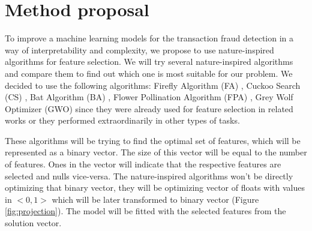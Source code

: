 \documentclass[runningheads]{llncs}
\begin{document}
\section{Method proposal}





To improve a machine learning models for the transaction fraud detection in a way of interpretability and complexity, we propose to use nature-inspired algorithms for feature selection. We will try several nature-inspired algorithms and compare them to find out which one is most suitable for our problem. We decided to use the following algorithms: Firefly Algorithm (FA) \cite{fister2013comprehensive}, Cuckoo Search (CS) \cite{yang2009cuckoo}, Bat Algorithm (BA) \cite{yang2010new}, Flower Pollination Algorithm (FPA) \cite{yang2012flower}, Grey Wolf Optimizer (GWO) \cite{Mirjalili_Mirjalili_Lewis_2014} since they were already used for feature selection in related works or they performed extraordinarily in other types of tasks.

These algorithms will be trying to find the optimal set of features, which will be represented as a binary vector. The size of this vector will be equal to the number of features. Ones in the vector will indicate that the respective features are selected and nulls vice-versa. The nature-inspired algorithms won't be directly optimizing that binary vector, they will be optimizing vector of floats with values in $<0, 1>$ which will be later transformed to binary vector (Figure \ref{fig:projection}). The model will be fitted with the selected features from the solution vector.
\end{document}
